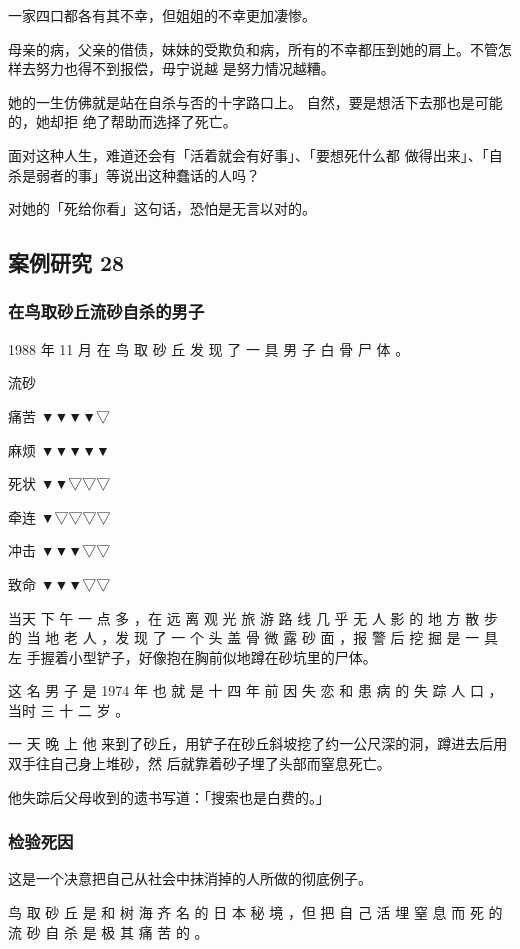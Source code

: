 \documentclass[UTF8]{ctexart}
\begin{document}
一家四口都各有其不幸，但姐姐的不幸更加凄惨。

母亲的病，父亲的借债，妹妹的受欺负和病，所有的不幸都压到她的肩上。不管怎样去努力也得不到报偿，毋宁说越 是努力情况越糟。

她的一生仿佛就是站在自杀与否的十字路口上。
自然，要是想活下去那也是可能的，她却拒 绝了帮助而选择了死亡。

面对这种人生，难道还会有「活着就会有好事」、「要想死什么都 做得出来」、「自杀是弱者的事」等说出这种蠢话的人吗？

对她的「死给你看」这句话，恐怕是无言以对的。



\subsection{案例研究 28}

\subsubsection*{在鸟取砂丘流砂自杀的男子}

1988 年 11 月 在 鸟 取 砂 丘 发 现 了 一 具 男 子 白 骨 尸 体 。

流砂

痛苦 ▼▼▼▼▽

麻烦 ▼▼▼▼▼

死状 ▼▼▽▽▽

牵连 ▼▽▽▽▽

冲击 ▼▼▼▽▽

致命 ▼▼▼▽▽

当天 下 午 一 点 多 ，在 远 离 观 光 旅 游 路 线 几 乎 无 人 影 的 地 方 散 步 的 当 地 老 人 ，发 现 了 一 个 头 盖 骨 微 露 砂 面 ，报 警 后 挖 掘 是 一 具 左 手握着小型铲子，好像抱在胸前似地蹲在砂坑里的尸体。

这 名 男 子 是 1974 年 也 就 是 十 四 年 前 因 失 恋 和 患 病 的 失 踪 人 口 ，当时 三 十 二 岁 。

一 天 晚 上 他 来到了砂丘，用铲子在砂丘斜坡挖了约一公尺深的洞，蹲进去后用双手往自己身上堆砂，然 后就靠着砂子埋了头部而窒息死亡。 

他失踪后父母收到的遗书写道：「搜索也是白费的。」

\subsubsection*{检验死因}

这是一个决意把自己从社会中抹消掉的人所做的彻底例子。

鸟 取 砂 丘 是 和 树 海 齐 名 的 日 本 秘 境 ，但 把 自 己 活 埋 窒 息 而 死 的 流 砂 自 杀 是 极 其 痛 苦 的 。
\end{document}
